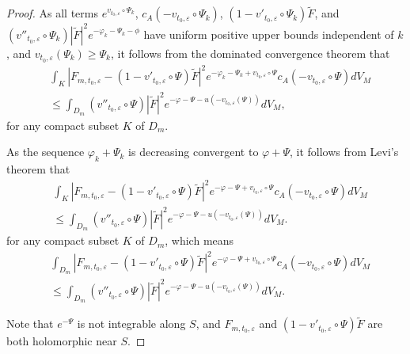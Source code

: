 \begin{proof}
As all terms $e^{v_{t_{0},\varepsilon}\circ\Psi_{k}}$,
$c_{A}(-v_{t_{0},\varepsilon}\circ\Psi_{k})$,
$(1-v'_{t_{0},\varepsilon}\circ\Psi_{k})\widetilde{F}$, and
$(v''_{t_0,\varepsilon}\circ\Psi_{k})|
\tilde{F}|^2e^{-\varphi_{k}-\Psi_{k}-\phi}$ have uniform positive
upper bounds independent of $k$, and
$v_{t_0,\varepsilon}(\Psi_{k})\geq\Psi_{k}$, it follows from the
dominated convergence theorem that
\begin{equation}
 \label{equ:semi.3.30.3}
 \begin{split}
 &\int_{K}|F_{m,t_0,\varepsilon}-(1-v'_{t_0,\varepsilon}\circ\Psi)\widetilde{F}|^{2}
 e^{-\varphi_{k}-\Psi_{k}+v_{t_0,\varepsilon}\circ\Psi}c_{A}(-v_{t_0,\varepsilon}\circ\Psi)dV_{M}
 \\&\leq
 \int_{D_m}(v''_{t_0,\varepsilon}\circ{\Psi})| \tilde{F}|^2e^{-\varphi-\Psi-u(-v_{t_{0},\varepsilon}(\Psi))}dV_M,
 \end{split}
\end{equation}
 for any compact subset $K$ of $D_{m}$.

As the sequence $\varphi_{k}+\Psi_{k}$ is decreasing convergent to
$\varphi+\Psi$, it follows from Levi's theorem that
\begin{equation}
 \label{equ:semi.3.30.4}
 \begin{split}
 &\int_{K}|F_{m,t_0,\varepsilon}-(1-v'_{t_0,\varepsilon}\circ\Psi)\widetilde{F}|^{2}
 e^{-\varphi-\Psi+v_{t_0,\varepsilon}\circ\Psi}c_{A}(-v_{t_0,\varepsilon}\circ\Psi)dV_{M}
 \\&\leq
 \int_{D_m}(v''_{t_0,\varepsilon}\circ{\Psi})| \tilde{F}|^2e^{-\varphi-\Psi-u(-v_{t_{0},\varepsilon}(\Psi))}dV_M.
 \end{split}
\end{equation}
for any compact subset $K$ of $D_{m}$, which means
\begin{equation}
 \label{equ:semi.3.30.5}
 \begin{split}
 &\int_{D_{m}}|F_{m,t_0,\varepsilon}-(1-v'_{t_0,\varepsilon}\circ\Psi)\widetilde{F}|^{2}
 e^{-\varphi-\Psi+v_{t_0,\varepsilon}\circ\Psi}c_{A}(-v_{t_0,\varepsilon}\circ\Psi)dV_{M}
 \\&\leq
 \int_{D_m}(v''_{t_0,\varepsilon}\circ{\Psi})| \tilde{F}|^2e^{-\varphi-\Psi-u(-v_{t_{0},\varepsilon}(\Psi))}dV_M.
 \end{split}
\end{equation}

Note that $e^{-\Psi}$ is not integrable along $S$, and
$F_{m,t_0,\varepsilon}$ and
$(1-v'_{t_0,\varepsilon}\circ\Psi)\widetilde{F}$ are both
holomorphic near $S$.


\end{proof}

